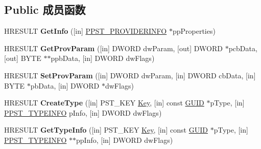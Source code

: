 \subsection*{Public 成员函数}
\begin{DoxyCompactItemize}
\item 
\mbox{\label{interface_p_s_t_o_r_e_c_lib_1_1_i_p_store_ac8bde8474d1d941da4bd91b40a2ad4a6}} 
H\+R\+E\+S\+U\+LT {\bfseries Get\+Info} (\mbox{[}in\mbox{]} \hyperlink{struct_p_s_t_o_r_e_c_lib_1_1___p_s_t___p_r_o_v_i_d_e_r_i_n_f_o}{P\+P\+S\+T\+\_\+\+P\+R\+O\+V\+I\+D\+E\+R\+I\+N\+FO} $\ast$pp\+Properties)
\item 
\mbox{\label{interface_p_s_t_o_r_e_c_lib_1_1_i_p_store_ae22a1495c52a62a00acffe71e9e9dd20}} 
H\+R\+E\+S\+U\+LT {\bfseries Get\+Prov\+Param} (\mbox{[}in\mbox{]} D\+W\+O\+RD dw\+Param, \mbox{[}out\mbox{]} D\+W\+O\+RD $\ast$pcb\+Data, \mbox{[}out\mbox{]} B\+Y\+TE $\ast$$\ast$ppb\+Data, \mbox{[}in\mbox{]} D\+W\+O\+RD dw\+Flags)
\item 
\mbox{\label{interface_p_s_t_o_r_e_c_lib_1_1_i_p_store_a9a62cc54b10772cbdb17ea9ae497f2ea}} 
H\+R\+E\+S\+U\+LT {\bfseries Set\+Prov\+Param} (\mbox{[}in\mbox{]} D\+W\+O\+RD dw\+Param, \mbox{[}in\mbox{]} D\+W\+O\+RD cb\+Data, \mbox{[}in\mbox{]} B\+Y\+TE $\ast$pb\+Data, \mbox{[}in\mbox{]} D\+W\+O\+RD $\ast$dw\+Flags)
\item 
\mbox{\label{interface_p_s_t_o_r_e_c_lib_1_1_i_p_store_a0baa649ca6b15011715eb07c5237b559}} 
H\+R\+E\+S\+U\+LT {\bfseries Create\+Type} (\mbox{[}in\mbox{]} P\+S\+T\+\_\+\+K\+EY \hyperlink{struct_key}{Key}, \mbox{[}in\mbox{]} const \hyperlink{interface_g_u_i_d}{G\+U\+ID} $\ast$p\+Type, \mbox{[}in\mbox{]} \hyperlink{struct_p_s_t_o_r_e_c_lib_1_1___p_s_t___t_y_p_e_i_n_f_o}{P\+P\+S\+T\+\_\+\+T\+Y\+P\+E\+I\+N\+FO} p\+Info, \mbox{[}in\mbox{]} D\+W\+O\+RD dw\+Flags)
\item 
\mbox{\label{interface_p_s_t_o_r_e_c_lib_1_1_i_p_store_aaf98a1fe67729e13604e58358cf51b75}} 
H\+R\+E\+S\+U\+LT {\bfseries Get\+Type\+Info} (\mbox{[}in\mbox{]} P\+S\+T\+\_\+\+K\+EY \hyperlink{struct_key}{Key}, \mbox{[}in\mbox{]} const \hyperlink{interface_g_u_i_d}{G\+U\+ID} $\ast$p\+Type, \mbox{[}in\mbox{]} \hyperlink{struct_p_s_t_o_r_e_c_lib_1_1___p_s_t___t_y_p_e_i_n_f_o}{P\+P\+S\+T\+\_\+\+T\+Y\+P\+E\+I\+N\+FO} $\ast$$\ast$pp\+Info, \mbox{[}in\mbox{]} D\+W\+O\+RD dw\+Flags)

\end{DoxyCompactItemize}
